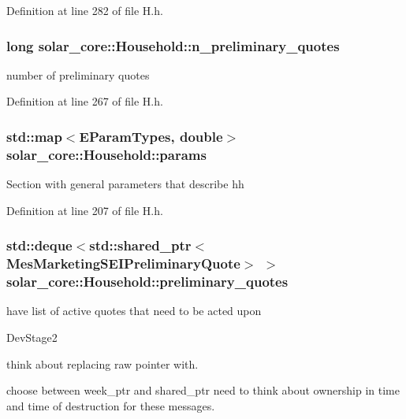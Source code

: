 Definition at line 282 of file H.\+h.

\hypertarget{classsolar__core_1_1_household_aedfc08b7837a3e2fa6ad9e62309694f3}{}
\subsubsection[{n\+\_\+preliminary\+\_\+quotes}]{\setlength{\rightskip}{0pt plus 5cm}long solar\+\_\+core\+::\+Household\+::n\+\_\+preliminary\+\_\+quotes\hspace{0.3cm}{\ttfamily [protected]}}\label{classsolar__core_1_1_household_aedfc08b7837a3e2fa6ad9e62309694f3}
number of preliminary quotes 

Definition at line 267 of file H.\+h.

\hypertarget{classsolar__core_1_1_household_a41d61dc3bab971cb19170341b77d9df8}{}
\subsubsection[{params}]{\setlength{\rightskip}{0pt plus 5cm}std\+::map$<${\bf E\+Param\+Types}, double$>$ solar\+\_\+core\+::\+Household\+::params\hspace{0.3cm}{\ttfamily [protected]}}\label{classsolar__core_1_1_household_a41d61dc3bab971cb19170341b77d9df8}
Section with general parameters that describe hh 

Definition at line 207 of file H.\+h.

\hypertarget{classsolar__core_1_1_household_a297842358a2d79db160566106972bc0d}{}
\subsubsection[{preliminary\+\_\+quotes}]{\setlength{\rightskip}{0pt plus 5cm}std\+::deque$<$std\+::shared\+\_\+ptr$<${\bf Mes\+Marketing\+S\+E\+I\+Preliminary\+Quote}$>$ $>$ solar\+\_\+core\+::\+Household\+::preliminary\+\_\+quotes\hspace{0.3cm}{\ttfamily [protected]}}\label{classsolar__core_1_1_household_a297842358a2d79db160566106972bc0d}
have list of active quotes that need to be acted upon\begin{DoxyRefDesc}{Dev\+Stage2}
\item[\hyperlink{_dev_stage2__DevStage2000012}{Dev\+Stage2}]think about replacing raw pointer with. 

choose between week\+\_\+ptr and shared\+\_\+ptr need to think about ownership in time and time of destruction for these messages. \end{DoxyRefDesc}


